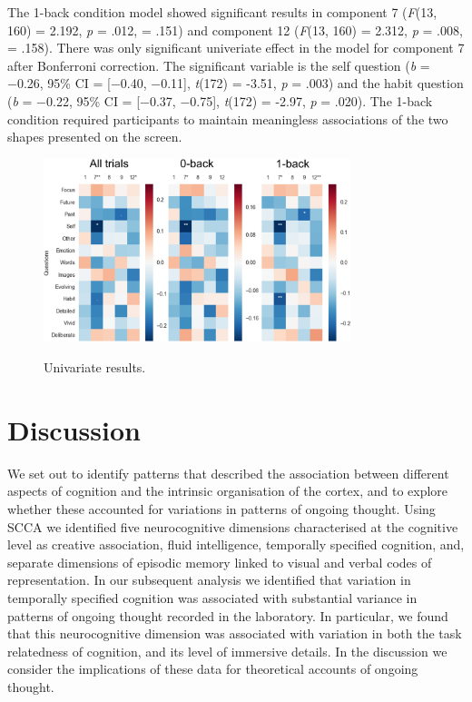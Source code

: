 The 1-back condition model showed significant results in
component 7
(\textit{F}(13, 160) = 2.192, \textit{p} = .012, \paretasquared = .151)
and component 12
(\textit{F}(13, 160) = 2.312, \textit{p} = .008, \paretasquared = .158). There was only significant univeriate effect in the model for component 7 after Bonferroni correction.
The significant variable is the self question
(\textit{b} = −0.26, 95\% CI = [−0.40, −0.11], \textit{t}(172) = -3.51, \textit{p} = .003)
and the habit question
(\textit{b} = −0.22, 95\% CI = [−0.37, −0.75], \textit{t}(172) = -2.97, \textit{p} = .020).
The 1-back condition required participants to maintain meaningless associations of the two shapes presented on the screen.

\begin{figure}[H]
	\centering
	\includegraphics[width=0.8\textwidth]{study3/image/study3fig4.png}
	\caption{Univariate results.}
	\caption*{
	\footnotesize{
	}
	}
	\label{fig:study3:fig4}
\end{figure}


\section{Discussion}
\label{study3:discussion}

We set out to identify patterns that described the association between different aspects of cognition and the intrinsic organisation of the cortex, and to explore whether these accounted for variations in patterns of ongoing thought. Using SCCA we identified five neurocognitive dimensions characterised at the cognitive level as creative association, fluid intelligence, temporally specified cognition, and, separate dimensions of episodic memory linked to visual and verbal codes of representation. In our subsequent analysis we identified that variation in temporally specified cognition was associated with substantial variance in patterns of ongoing thought recorded in the laboratory. In particular, we found that this neurocognitive dimension was associated with variation in both the task relatedness of cognition, and its level of immersive details. In the discussion we consider the implications of these data for theoretical accounts of ongoing thought.

